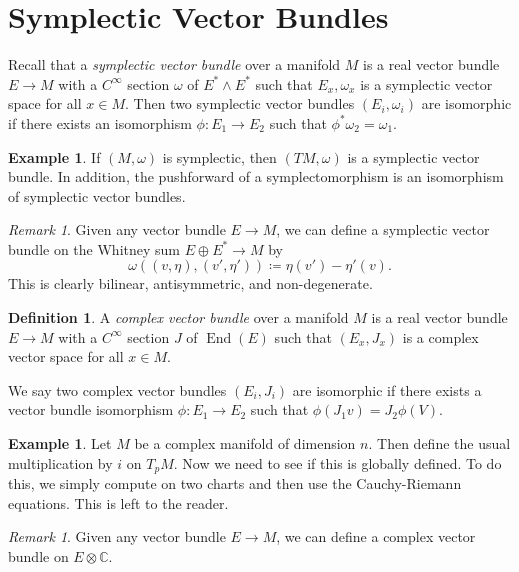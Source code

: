 \documentclass[leqno, openany]{memoir}
\theoremstyle{definition}
\newtheorem{defn}[thm]{Definition}
\newtheorem{exm}[thm]{Example}
\theoremstyle{remark}
\newtheorem{rmk}[thm]{Remark}
\theoremstyle{plain}
\theoremstyle{definition}
\theoremstyle{remark}
\newcommand{\C}{\mathbb{C}}
\DeclareMathOperator{\End}{End}
\begin{document}
\section{Symplectic Vector Bundles}%

Recall that a \textit{symplectic vector bundle} over a manifold $M$ is a real
vector bundle $E \to M$ with a $C^{\infty}$ section $\omega$ of $E^* \wedge
E^*$ such that $E_x, \omega_x$ is a symplectic vector space for all $x \in M$.
Then two symplectic vector bundles $(E_i, \omega_i)$ are isomorphic if there
exists an isomorphism $\phi: E_1 \to E_2$ such that $\phi^* \omega_2 =
\omega_1$.

\begin{exm} If $(M, \omega)$ is symplectic, then $(TM, \omega)$ is a symplectic
vector bundle. In addition, the pushforward of a symplectomorphism is an
isomorphism of symplectic vector bundles.  \end{exm}

\begin{rmk} Given any vector bundle $E \to M$, we can define a symplectic
    vector bundle on the Whitney sum $E \oplus E^* \to M$ by \[ \omega((v,
    \eta), (v', \eta')) \coloneqq \eta(v') - \eta'(v). \] This is clearly
    bilinear, antisymmetric, and non-degenerate.  \end{rmk}

\begin{defn} A \textit{complex vector bundle} over a manifold $M$ is a real
vector bundle $E \to M$ with a $C^{\infty}$ section $J$ of $\End(E)$ such that
$(E_x, J_x)$ is a complex vector space for all $x \in M$.  \end{defn} We say
two complex vector bundles $(E_i, J_i)$ are isomorphic if there exists a vector
bundle isomorphism $\phi: E_1 \to E_2$ such that $\phi(J_1 v) = J_2 \phi(V)$.

\begin{exm} Let $M$ be a complex manifold of dimension $n$. Then define the
    usual multiplication by $i$ on $T_pM$. Now we need to see if this is
    globally defined. To do this, we simply compute on two charts and then use
    the Cauchy-Riemann equations. This is left to the reader.  \end{exm}

\begin{rmk} Given any vector bundle $E \to M$, we can define a complex vector
bundle on $E \otimes \C$.  \end{rmk}
\end{document}
